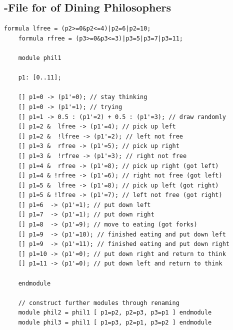 \documentclass[preview]{standalone}
\begin{document}
\subsection[\prism-File Dining Philosophers]{\prism-File for \mdpN of Dining Philosophers} \label{lst:0601diningphilosophersfull}
\begin{lstlisting}[language=prism, caption={PRISM model file for \mdpN of Dining Philosophers}]
	formula lfree = (p2>=0&p2<=4)|p2=6|p2=10;
	formula rfree = (p3>=0&p3<=3)|p3=5|p3=7|p3=11;
	
	module phil1
	
	p1: [0..11];
	
	[] p1=0 -> (p1'=0); // stay thinking
	[] p1=0 -> (p1'=1); // trying
	[] p1=1 -> 0.5 : (p1'=2) + 0.5 : (p1'=3); // draw randomly
	[] p1=2 &  lfree -> (p1'=4); // pick up left
	[] p1=2 &  !lfree -> (p1'=2); // left not free
	[] p1=3 &  rfree -> (p1'=5); // pick up right
	[] p1=3 &  !rfree -> (p1'=3); // right not free
	[] p1=4 &  rfree -> (p1'=8); // pick up right (got left)
	[] p1=4 & !rfree -> (p1'=6); // right not free (got left)
	[] p1=5 &  lfree -> (p1'=8); // pick up left (got right)
	[] p1=5 & !lfree -> (p1'=7); // left not free (got right)
	[] p1=6  -> (p1'=1); // put down left
	[] p1=7  -> (p1'=1); // put down right
	[] p1=8  -> (p1'=9); // move to eating (got forks)
	[] p1=9  -> (p1'=10); // finished eating and put down left 
	[] p1=9  -> (p1'=11); // finished eating and put down right
	[] p1=10 -> (p1'=0); // put down right and return to think
	[] p1=11 -> (p1'=0); // put down left and return to think
	
	endmodule
	
	// construct further modules through renaming
	module phil2 = phil1 [ p1=p2, p2=p3, p3=p1 ] endmodule
	module phil3 = phil1 [ p1=p3, p2=p1, p3=p2 ] endmodule	
			
\end{lstlisting}
	
\pagebreak
\end{document}

